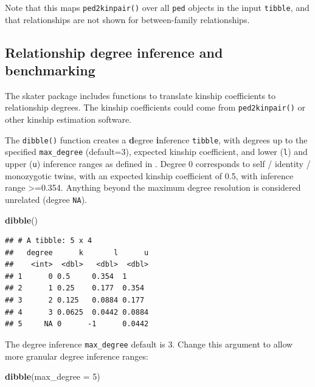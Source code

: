 \documentclass[9pt,a4paper,]{extarticle}
\newenvironment{Shaded}{\begin{snugshade}}{\end{snugshade}}
\newcommand{\DataTypeTok}[1]{\textcolor[rgb]{0.13,0.29,0.53}{#1}}
\newcommand{\DecValTok}[1]{\textcolor[rgb]{0.00,0.00,0.81}{#1}}
\newcommand{\KeywordTok}[1]{\textcolor[rgb]{0.13,0.29,0.53}{\textbf{#1}}}
\newcommand{\NormalTok}[1]{#1}
\begin{document}
Note that this maps \texttt{ped2kinpair()} over all \texttt{ped} objects in the input \texttt{tibble}, and that relationships are not shown for between-family relationships.

\hypertarget{relationship-degree-inference-and-benchmarking}{%
\subsection{Relationship degree inference and benchmarking}\label{relationship-degree-inference-and-benchmarking}}

The skater package includes functions to translate kinship coefficients to relationship degrees. The kinship coefficients could come from \texttt{ped2kinpair()} or other kinship estimation software.

The \texttt{dibble()} function creates a \textbf{d}egree \textbf{i}nference \texttt{tibble}, with degrees up to the specified \texttt{max\_degree} (default=3), expected kinship coefficient, and lower (\texttt{l}) and upper (\texttt{u}) inference ranges as defined in \citet{manichaikul2010}. Degree 0 corresponds to self / identity / monozygotic twins, with an expected kinship coefficient of 0.5, with inference range \textgreater=0.354. Anything beyond the maximum degree resolution is considered unrelated (degree \texttt{NA}).

\begin{Shaded}
\begin{Highlighting}[]
\KeywordTok{dibble}\NormalTok{()}
\end{Highlighting}
\end{Shaded}

\begin{verbatim}
## # A tibble: 5 x 4
##   degree      k       l      u
##    <int>  <dbl>   <dbl>  <dbl>
## 1      0 0.5     0.354  1     
## 2      1 0.25    0.177  0.354 
## 3      2 0.125   0.0884 0.177 
## 4      3 0.0625  0.0442 0.0884
## 5     NA 0      -1      0.0442
\end{verbatim}

The degree inference \texttt{max\_degree} default is 3. Change this argument to allow more granular degree inference ranges:

\begin{Shaded}
\begin{Highlighting}[]
\KeywordTok{dibble}\NormalTok{(}\DataTypeTok{max_degree =} \DecValTok{5}\NormalTok{)}
\end{Highlighting}
\end{Shaded}
\end{document}
